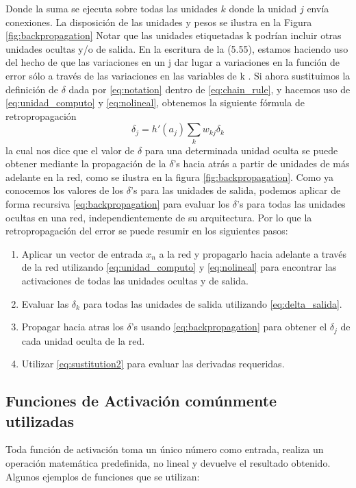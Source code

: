 \documentclass[a4paper,11pt,spanish]{book}
\begin{document}
	Donde la suma se ejecuta sobre todas las unidades $k$ donde la unidad $j$ envía conexiones. La disposición de las unidades y pesos se ilustra en la Figura \ref{fig:backpropagation} 
	Notar que las unidades etiquetadas k podrían incluir otras unidades ocultas y/o de salida. En la escritura de la (5.55), estamos haciendo uso del hecho 
	de que las variaciones en un j dar lugar a variaciones en la función de error sólo a través de las variaciones en las variables de k . Si ahora sustituimos la definición 
	de $\delta$ dada por \eqref{eq:notation} dentro de \eqref{eq:chain_rule}, y hacemos uso de \eqref{eq:unidad_computo} y \eqref{eq:nolineal}, obtenemos la siguiente fórmula de retropropagación
	\begin{equation}\label{eq:backpropagation}
	  \delta_j = h'(a_j) \sum_k w_{kj} \delta_k
	\end{equation}
	la cual nos dice que el valor de $\delta$ para una determinada unidad oculta se puede obtener mediante la propagación de la $\delta$'s hacia atrás a partir de unidades 
	de más adelante en la red, como se ilustra en la figura \ref{fig:backpropagation}.  
	Como ya conocemos los valores de los $\delta$'s para las unidades de salida, podemos aplicar de forma recursiva \eqref{eq:backpropagation} para evaluar los $\delta$'s 
	para todas las unidades ocultas en una red, independientemente de su arquitectura.
	Por lo que la retropropagación del error se puede resumir en los siguientes pasos:
	\begin{enumerate}
	  \item Aplicar un vector de entrada $x_n$ a la red y  propagarlo hacia adelante a través de la red utilizando \eqref{eq:unidad_computo} y \eqref{eq:nolineal} para encontrar 
	  las activaciones de todas las unidades ocultas y de salida.
	  \item Evaluar las $\delta_k$ para todas las unidades de salida utilizando \eqref{eq:delta_salida}.
	  \item Propagar hacia atras los $\delta$'s usando \eqref{eq:backpropagation} para obtener el $\delta_j$ de cada unidad oculta de la red.
	  \item Utilizar \eqref{eq:sustitution2} para evaluar las derivadas requeridas.
	\end{enumerate}


      \subsection {Funciones de Activación comúnmente utilizadas}
	Toda función de activación toma un único número como entrada, realiza un operación matemática predefinida, no lineal y devuelve el resultado obtenido.
	Algunos ejemplos de funciones que se utilizan:
\end{document}
